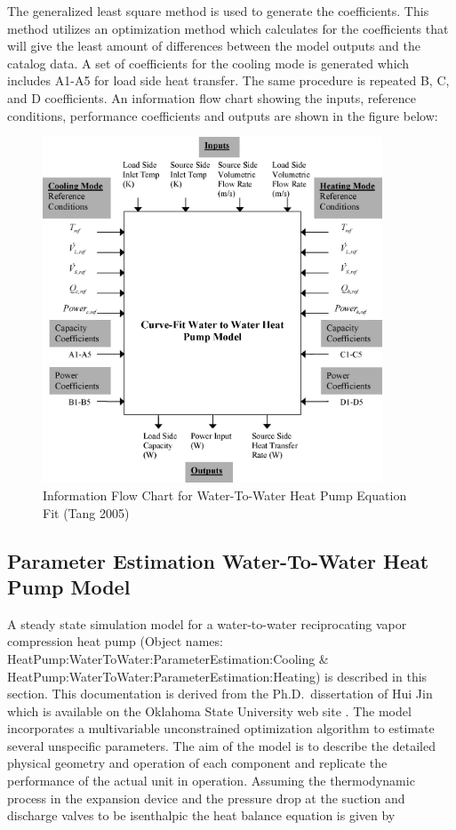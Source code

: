 The generalized least square method is used to generate the coefficients. This method utilizes an optimization method which calculates for the coefficients that will give the least amount of differences between the model outputs and the catalog data. A set of coefficients for the cooling mode is generated which includes A1-A5 for load side heat transfer. The same procedure is repeated B, C, and D coefficients. An information flow chart showing the inputs, reference conditions, performance coefficients and outputs are shown in the figure below:

\begin{figure}[hbtp] %
\centering
\includegraphics[width=0.9\textwidth, height=0.9\textheight, keepaspectratio=true]{media/image5290.png}
\caption{Information Flow Chart for Water-To-Water Heat Pump Equation Fit (Tang 2005) \protect \label{fig:information-flow-chart-for-water-to-water}}
\end{figure}

\subsection{Parameter Estimation Water-To-Water Heat Pump Model}\label{parameter-estimation-water-to-water-heat-pump-model}

A steady state simulation model for a water-to-water reciprocating vapor compression heat pump (Object names: HeatPump:WaterToWater:ParameterEstimation:Cooling \& HeatPump:WaterToWater:ParameterEstimation:Heating) is described in this section. This documentation is derived from the Ph.D.~dissertation of Hui Jin which is available on the Oklahoma State University web site . The model incorporates a multivariable unconstrained optimization algorithm to estimate several unspecific parameters. The aim of the model is to describe the detailed physical geometry and operation of each component and replicate the performance of the actual unit in operation. Assuming the thermodynamic process in the expansion device and the pressure drop at the suction and discharge valves to be isenthalpic the heat balance equation is given by

